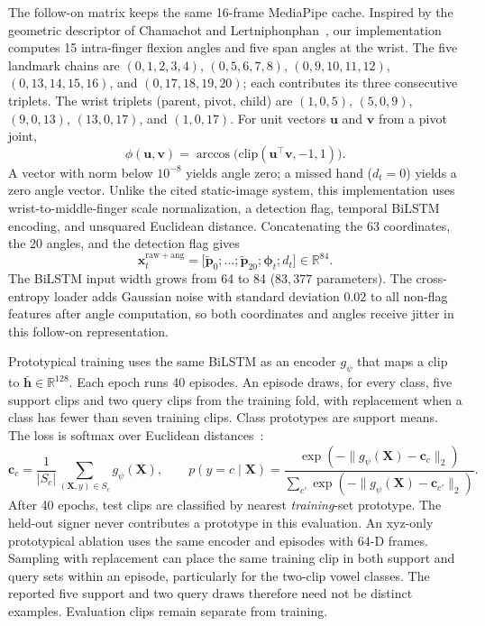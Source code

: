 \documentclass[11pt,a4paper]{article}
\begin{document}
The follow-on matrix keeps the same 16-frame MediaPipe cache. Inspired by the geometric descriptor of Chamachot and Lertniphonphan~\cite{chamachot2026geometry}, our implementation computes 15 intra-finger flexion angles and five span angles at the wrist. The five landmark chains are $(0,1,2,3,4)$, $(0,5,6,7,8)$, $(0,9,10,11,12)$, $(0,13,14,15,16)$, and $(0,17,18,19,20)$; each contributes its three consecutive triplets. The wrist triplets (parent, pivot, child) are $(1,0,5)$, $(5,0,9)$, $(9,0,13)$, $(13,0,17)$, and $(1,0,17)$. For unit vectors $\mathbf{u}$ and $\mathbf{v}$ from a pivot joint,
\begin{equation}
\phi(\mathbf{u},\mathbf{v}) = \arccos\bigl(\mathrm{clip}(\mathbf{u}^{\top}\mathbf{v}, -1, 1)\bigr).
\end{equation}
A vector with norm below $10^{-8}$ yields angle zero; a missed hand ($d_t=0$) yields a zero angle vector. Unlike the cited static-image system, this implementation uses wrist-to-middle-finger scale normalization, a detection flag, temporal BiLSTM encoding, and unsquared Euclidean distance. Concatenating the 63 coordinates, the 20 angles, and the detection flag gives
\begin{equation}
\mathbf{x}_t^{\mathrm{raw+ang}} = \bigl[\tilde{\mathbf{p}}_0;\ldots;\tilde{\mathbf{p}}_{20}; \boldsymbol{\phi}_t; d_t\bigr] \in \mathbb{R}^{84}.
\end{equation}
The BiLSTM input width grows from 64 to 84 ($83{,}377$ parameters). The cross-entropy loader adds Gaussian noise with standard deviation $0.02$ to all non-flag features after angle computation, so both coordinates and angles receive jitter in this follow-on representation.

Prototypical training uses the same BiLSTM as an encoder $g_{\psi}$ that maps a clip to $\bar{\mathbf{h}} \in \mathbb{R}^{128}$. Each epoch runs 40 episodes. An episode draws, for every class, five support clips and two query clips from the training fold, with replacement when a class has fewer than seven training clips. Class prototypes are support means. The loss is softmax over Euclidean distances~\cite{snell2017prototypical}:
\begin{equation}
\mathbf{c}_c = \frac{1}{|S_c|}\sum_{(\mathbf{X},y)\in S_c} g_{\psi}(\mathbf{X}), \qquad
p(y=c\mid\mathbf{X}) = \frac{\exp(-\lVert g_{\psi}(\mathbf{X})-\mathbf{c}_c\rVert_2)}{\sum_{c'}\exp(-\lVert g_{\psi}(\mathbf{X})-\mathbf{c}_{c'}\rVert_2)}.
\end{equation}
After 40 epochs, test clips are classified by nearest \emph{training}-set prototype. The held-out signer never contributes a prototype in this evaluation. An xyz-only prototypical ablation uses the same encoder and episodes with 64-D frames. Sampling with replacement can place the same training clip in both support and query sets within an episode, particularly for the two-clip vowel classes. The reported five support and two query draws therefore need not be distinct examples. Evaluation clips remain separate from training.
\end{document}
